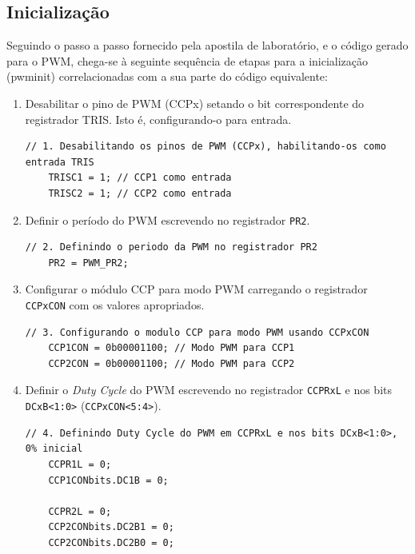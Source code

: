 \documentclass{article}
\begin{document}
\subsection{Inicialização}
Seguindo o passo a passo fornecido pela apostila de laboratório, e o código gerado para o PWM, chega-se à seguinte sequência de etapas para a inicialização (pwm\textunderscore init) correlacionadas com a sua parte do código equivalente:

\begin{enumerate}
  \item Desabilitar o pino de PWM (CCPx) setando o bit correspondente do registrador TRIS. Isto é, configurando-o para entrada.
    \begin{lstlisting}[style = Matlab-editor, language = C2]
    // 1. Desabilitando os pinos de PWM (CCPx), habilitando-os como entrada TRIS
    TRISC1 = 1; // CCP1 como entrada
    TRISC2 = 1; // CCP2 como entrada
    \end{lstlisting}
  
  \item Definir o período do PWM escrevendo no registrador \texttt{PR2}.
    \begin{lstlisting}[style = Matlab-editor, language = C2]
    // 2. Definindo o periodo da PWM no registrador PR2
    PR2 = PWM_PR2;
    \end{lstlisting}
    
  \item Configurar o módulo CCP para modo PWM carregando o registrador \texttt{CCPxCON} com os valores apropriados.
    \begin{lstlisting}[style = Matlab-editor, language = C2]
    // 3. Configurando o modulo CCP para modo PWM usando CCPxCON
    CCP1CON = 0b00001100; // Modo PWM para CCP1
    CCP2CON = 0b00001100; // Modo PWM para CCP2
    \end{lstlisting}
      
  \item Definir o \textit{Duty Cycle} do PWM escrevendo no registrador \texttt{CCPRxL} e nos bits \texttt{DCxB\textless1:0\textgreater} (\texttt{CCPxCON\textless5:4\textgreater}).
    \begin{lstlisting}[style = Matlab-editor, language = C2]
    // 4. Definindo Duty Cycle do PWM em CCPRxL e nos bits DCxB<1:0>, 0% inicial
    CCPR1L = 0;
    CCP1CONbits.DC1B = 0;

    CCPR2L = 0;
    CCP2CONbits.DC2B1 = 0;
    CCP2CONbits.DC2B0 = 0;
    \end{lstlisting}
      

\end{enumerate}
\end{document}
